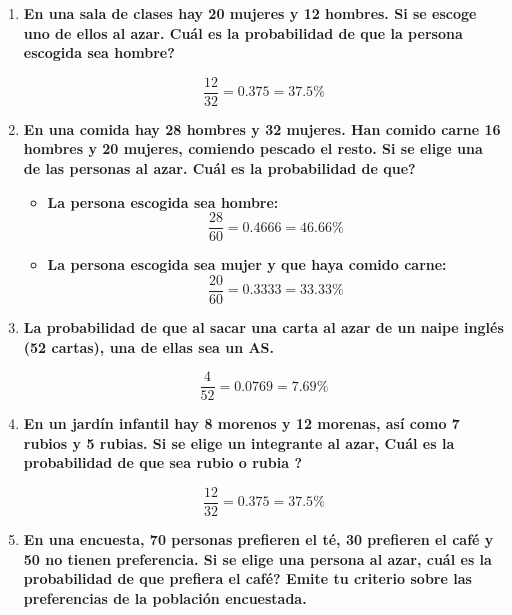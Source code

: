\documentclass[12pt]{article}
\begin{document}
\begin{enumerate}[label=\textbf{\arabic*.}]
        \item \textbf{En una sala de clases hay 20 mujeres y 12 hombres. Si se escoge uno de ellos al
                        azar. \textquestiondown Cuál es la probabilidad de que la persona escogida sea hombre?}

                         \[\frac{12}{32} = 0.375 = 37.5\%\]
        
        \newpage
        \item \textbf{En una comida hay 28 hombres y 32 mujeres. Han comido carne 16 hombres y
                        20 mujeres, comiendo pescado el resto. Si se elige una de las personas al azar.
                        \textquestiondown Cuál es la probabilidad de que?}

                        \begin{itemize}
                            \item \textbf{La persona escogida sea hombre:} \[\frac{28}{60} = 0.4666 = 46.66\%\]
                            \item \textbf{La persona escogida sea mujer y que haya comido carne:} \[\frac{20}{60} = 0.3333 = 33.33\%\]
                        \end{itemize}
        
        \item \textbf{La probabilidad de que al sacar una carta al azar de un naipe inglés (52 cartas), una de 
                        ellas sea un AS.}

                        \[\frac{4}{52} = 0.0769 = 7.69\%\]
        
        \item \textbf{En un jardín infantil hay 8 morenos y 12 morenas, así como 7 rubios y 5 rubias.
                        Si se elige un integrante al azar, \textquestiondown Cuál es la probabilidad de que sea rubio o
                        rubia ?}

                        \[\frac{12}{32} = 0.375 = 37.5\%\]
        
        \item \textbf{En una encuesta, 70 personas prefieren el té, 30 prefieren el café y 50 no tienen
                        preferencia. Si se elige una persona al azar, \textquestiondown cuál es la probabilidad de que
                        prefiera el café? Emite tu criterio sobre las preferencias de la población
                        encuestada.}


\end{enumerate}
\end{document}
